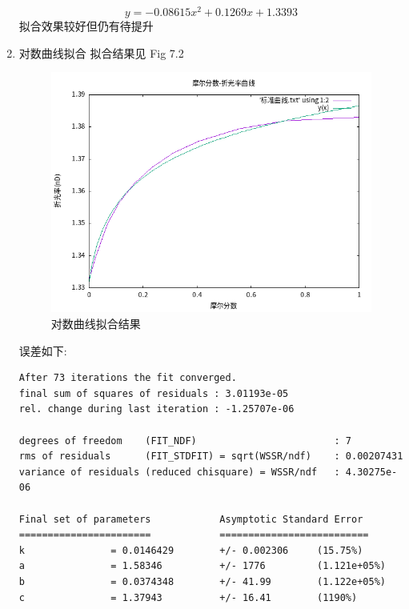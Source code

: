 \documentclass[11pt]{report}
\begin{document}
\begin{enumerate}
\begin{verbatim}
\end{verbatim}
\[
y=-0.08615x^{2}+0.1269x+1.3393
\]
拟合效果较好但仍有待提升
\item 对数曲线拟合
\label{sec:orge21dff5}
拟合结果见 Fig 7.2
\begin{figure}[htbp]
\centering
\includegraphics[width=.9\linewidth]{../data/标准曲线-对数曲线拟合.png}
\caption{\label{fig:orgdbf146d}对数曲线拟合结果}
\end{figure}
误差如下:
\begin{verbatim}
After 73 iterations the fit converged.
final sum of squares of residuals : 3.01193e-05
rel. change during last iteration : -1.25707e-06

degrees of freedom    (FIT_NDF)                        : 7
rms of residuals      (FIT_STDFIT) = sqrt(WSSR/ndf)    : 0.00207431
variance of residuals (reduced chisquare) = WSSR/ndf   : 4.30275e-06

Final set of parameters            Asymptotic Standard Error
=======================            ==========================
k               = 0.0146429        +/- 0.002306     (15.75%)
a               = 1.58346          +/- 1776         (1.121e+05%)
b               = 0.0374348        +/- 41.99        (1.122e+05%)
c               = 1.37943          +/- 16.41        (1190%)


\end{verbatim}
\end{enumerate}
\end{document}
